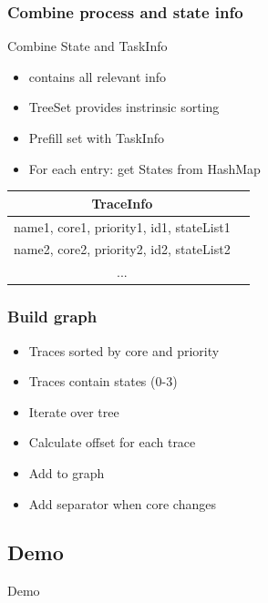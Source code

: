 \documentclass{beamer}
\begin{document}
\begin{frame}
	\frametitle{Combine process and state info}
	\begin{block}{Combine State and TaskInfo}
		\begin{itemize}
			\item contains all relevant info
			\item TreeSet provides instrinsic sorting
			\item Prefill set with TaskInfo
			\item For each entry: get States from HashMap
		\end{itemize}
	\end{block}
	\vspace{2mm}
	\begin{tabular}{|c|c|}
		\hline 
		\textbf{TraceInfo}  \\
		\hline 
		name1, core1, priority1, id1, stateList1 \\
		\hline 
		name2, core2, priority2, id2, stateList2  \\ 
		\hline 
		...  \\ 
		\hline 
	\end{tabular}
\end{frame}

\begin{frame}
	\frametitle{Build graph}
	\begin{block}{}
		\begin{itemize}
			\item Traces sorted by core and priority
			\item Traces contain states (0-3)
			\item Iterate over tree
			\item Calculate offset for each trace
			\item Add to graph
			\item Add separator when core changes
		\end{itemize}
	\end{block}
\end{frame}




\begin{frame}
\section{Demo}
	\centering
	\huge
	Demo
\end{frame}
\end{document}
